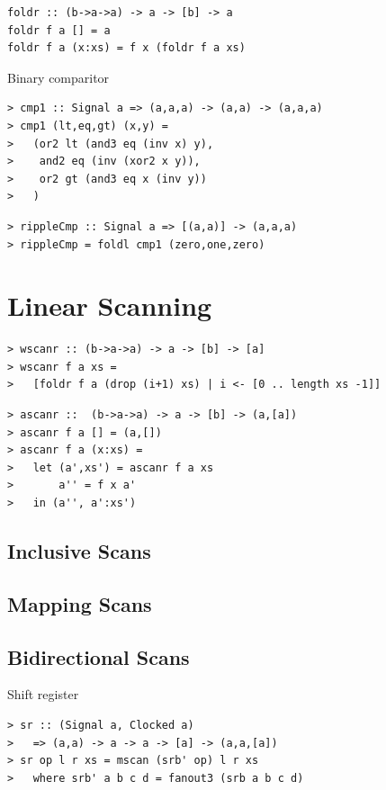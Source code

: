 \documentclass[a4paper,openany,fleqn]{book}
\begin{document}
\begin{verbatim}
foldr :: (b->a->a) -> a -> [b] -> a
foldr f a [] = a
foldr f a (x:xs) = f x (foldr f a xs)
\end{verbatim}

Binary comparitor

\begin{verbatim}
> cmp1 :: Signal a => (a,a,a) -> (a,a) -> (a,a,a)
> cmp1 (lt,eq,gt) (x,y) =
>   (or2 lt (and3 eq (inv x) y),
>    and2 eq (inv (xor2 x y)),
>    or2 gt (and3 eq x (inv y))
>   )
\end{verbatim}

\begin{verbatim}
> rippleCmp :: Signal a => [(a,a)] -> (a,a,a)
> rippleCmp = foldl cmp1 (zero,one,zero)
\end{verbatim}

\section{Linear Scanning}
\label{sec:linear-scanning}

\begin{verbatim}
> wscanr :: (b->a->a) -> a -> [b] -> [a]
> wscanr f a xs =
>   [foldr f a (drop (i+1) xs) | i <- [0 .. length xs -1]]
\end{verbatim}

\begin{verbatim}
> ascanr ::  (b->a->a) -> a -> [b] -> (a,[a])
> ascanr f a [] = (a,[])
> ascanr f a (x:xs) =
>   let (a',xs') = ascanr f a xs
>       a'' = f x a'
>   in (a'', a':xs')
\end{verbatim}

\subsection{Inclusive Scans}
\label{sec:inclusive-scans}

\subsection{Mapping Scans}
\label{sec:mapping-scans}


\subsection{Bidirectional Scans}
\label{sec:bidirectional-scans}

Shift register

\begin{verbatim}
> sr :: (Signal a, Clocked a)
>   => (a,a) -> a -> a -> [a] -> (a,a,[a])
> sr op l r xs = mscan (srb' op) l r xs
>   where srb' a b c d = fanout3 (srb a b c d)
\end{verbatim}
\end{document}
